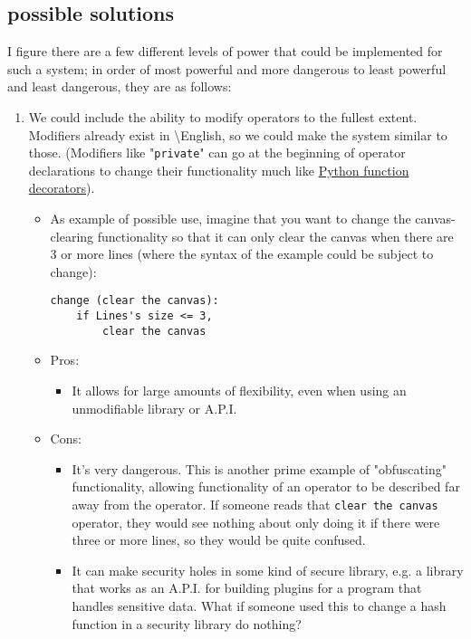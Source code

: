 \documentclass{article}
\newcommand{\name}{\textbackslash{}English}
\begin{document}
\subsection{possible solutions}
\indent I figure there are a few different levels of power that could be implemented for such a system; in order of most powerful and more dangerous to least powerful and least dangerous, they are as follows:\\
\begin{enumerate}
	\item We could include the ability to modify operators to the fullest extent. Modifiers already exist in \name{}, so we could make the system similar to those. (Modifiers like "\texttt{private}" can go at the beginning of operator declarations to change their functionality much like \href{http://simeonfranklin.com/blog/2012/jul/1/python-decorators-in-12-steps/}{Python function decorators}).
	\begin{itemize}
		\item As example of possible use, imagine that you want to change the canvas-clearing functionality so that it can only clear the canvas when there are 3 or more lines (where the syntax of the example could be subject to change):
			\begin{lstlisting}
change (clear the canvas):
	if Lines's size <= 3,
		clear the canvas
			\end{lstlisting}
		\item Pros:
		\begin{itemize}
			\item It allows for large amounts of flexibility, even when using an unmodifiable library or A.P.I.
		\end{itemize}
		\item Cons:
		\begin{itemize}
			\item It's very dangerous. This is another prime example of "obfuscating" functionality, allowing functionality of an operator to be described far away from the operator. If someone reads that \texttt{clear the canvas} operator, they would see nothing about only doing it if there were three or more lines, so they would be quite confused.
			\item It can make security holes in some kind of secure library, e.g. a library that works as an A.P.I. for building plugins for a program that handles sensitive data. What if someone used this to change a hash function in a security library do nothing?
		\end{itemize}

\end{itemize}
\end{enumerate}
\end{document}
